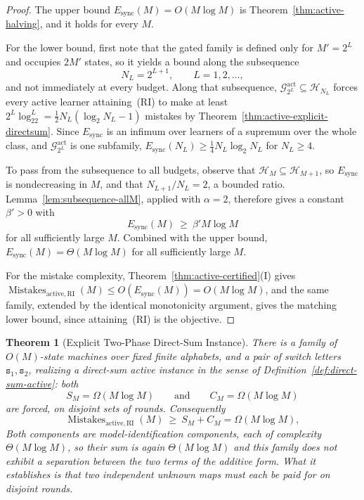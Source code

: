 \documentclass[12pt]{article}
\newtheorem{theorem}{Theorem}[section]
\theoremstyle{definition}
\newcommand{\Esync}{E_{\mathrm{sync}}}
\newcommand{\MistRI}{\operatorname{Mistakes}_{\mathrm{active,RI}}}
\newcommand{\Gact}{\mathcal G^{\mathrm{act}}}
\begin{document}
\begin{proof}
The upper bound $\Esync(M)=O(M\log M)$ is Theorem~\ref{thm:active-halving},
and it holds for every $M$.

For the lower bound, first note that the gated family is defined only for
$M'=2^L$ and occupies $2M'$ states, so it yields a bound along the subsequence
\[
N_L=2^{L+1},
\qquad L=1,2,\dots,
\]
and not immediately at every budget.  Along that subsequence,
$\Gact_{2^L}\subseteq\mathcal H_{N_L}$ forces every active learner
attaining~(RI) to make at least
$2^L\log_22^L=\tfrac12N_L(\log_2N_L-1)$ mistakes by
Theorem~\ref{thm:active-explicit-directsum}.  Since $\Esync$ is an infimum over
learners of a supremum over the whole class, and $\Gact_{2^L}$ is one
subfamily, $\Esync(N_L)\ge\tfrac14N_L\log_2N_L$ for $N_L\ge4$.

To pass from the subsequence to all budgets, observe that
$\mathcal H_M\subseteq\mathcal H_{M+1}$, so $\Esync$ is nondecreasing in $M$,
and that $N_{L+1}/N_L=2$, a bounded ratio.  Lemma~\ref{lem:subsequence-allM},
applied with $\alpha=2$, therefore gives a constant $\beta'>0$ with
\[
\Esync(M)\ \ge\ \beta'M\log M
\]
for all sufficiently large $M$.  Combined with the upper bound,
$\Esync(M)=\Theta(M\log M)$ for all sufficiently large $M$.

For the mistake complexity, Theorem~\ref{thm:active-certified}(I) gives
$\MistRI(M)\le O(\Esync(M))=O(M\log M)$, and
the same family, extended by the identical monotonicity argument, gives the
matching lower bound, since attaining~(RI) is the objective.
\end{proof}


\begin{theorem}[Explicit Two-Phase Direct-Sum Instance]
\label{thm:active-two-phase}
There is a family of $O(M)$-state machines over fixed finite alphabets, and a
pair of switch letters $\mathtt s_1,\mathtt s_2$, realizing a direct-sum active
instance in the sense of Definition~\ref{def:direct-sum-active}: both
\[
S_M=\Omega(M\log M)
\qquad\text{and}\qquad
C_M=\Omega(M\log M)
\]
are forced, on disjoint sets of rounds.  Consequently
\[
\MistRI(M)
\ \ge\
S_M+C_M
=
\Omega(M\log M),
\]
Both components are model-identification components, each of complexity
$\Theta(M\log M)$, so their sum is again $\Theta(M\log M)$ and this family does
\emph{not} exhibit a separation between the two terms of the additive form.
What it establishes is that two independent unknown maps must each be paid for
on disjoint rounds.
\end{theorem}
\end{document}
